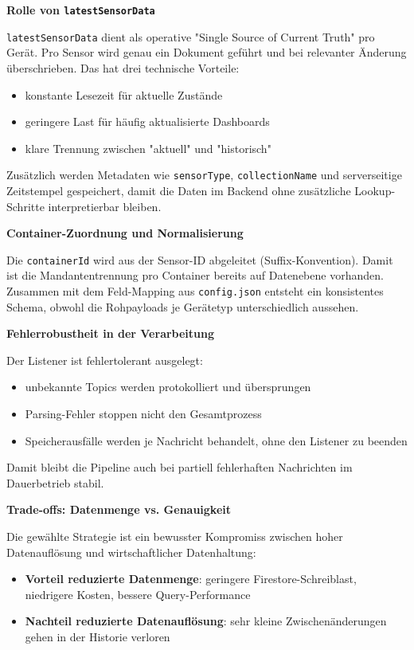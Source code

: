\textbf{Rolle von \texttt{latestSensorData}}

\texttt{latestSensorData} dient als operative "Single Source of Current Truth" pro Gerät. Pro Sensor wird genau ein Dokument geführt und bei relevanter Änderung überschrieben. Das hat drei technische Vorteile:

\begin{itemize}
    \item konstante Lesezeit für aktuelle Zustände
    \item geringere Last für häufig aktualisierte Dashboards
    \item klare Trennung zwischen "aktuell" und "historisch"
\end{itemize}

Zusätzlich werden Metadaten wie \texttt{sensorType}, \texttt{collectionName} und serverseitige Zeitstempel gespeichert, damit die Daten im Backend ohne zusätzliche Lookup-Schritte interpretierbar bleiben.

\textbf{Container-Zuordnung und Normalisierung}

Die \texttt{containerId} wird aus der Sensor-ID abgeleitet (Suffix-Konvention). Damit ist die Mandantentrennung pro Container bereits auf Datenebene vorhanden. Zusammen mit dem Feld-Mapping aus \texttt{config.json} entsteht ein konsistentes Schema, obwohl die Rohpayloads je Gerätetyp unterschiedlich aussehen.

\textbf{Fehlerrobustheit in der Verarbeitung}

Der Listener ist fehlertolerant ausgelegt:

\begin{itemize}
    \item unbekannte Topics werden protokolliert und übersprungen
    \item Parsing-Fehler stoppen nicht den Gesamtprozess
    \item Speicherausfälle werden je Nachricht behandelt, ohne den Listener zu beenden
\end{itemize}

Damit bleibt die Pipeline auch bei partiell fehlerhaften Nachrichten im Dauerbetrieb stabil.

\textbf{Trade-offs: Datenmenge vs. Genauigkeit}

Die gewählte Strategie ist ein bewusster Kompromiss zwischen hoher Datenauflösung und wirtschaftlicher Datenhaltung:

\begin{itemize}
    \item \textbf{Vorteil reduzierte Datenmenge}: geringere Firestore-Schreiblast, niedrigere Kosten, bessere Query-Performance
    \item \textbf{Nachteil reduzierte Datenauflösung}: sehr kleine Zwischenänderungen gehen in der Historie verloren
\end{itemize}

